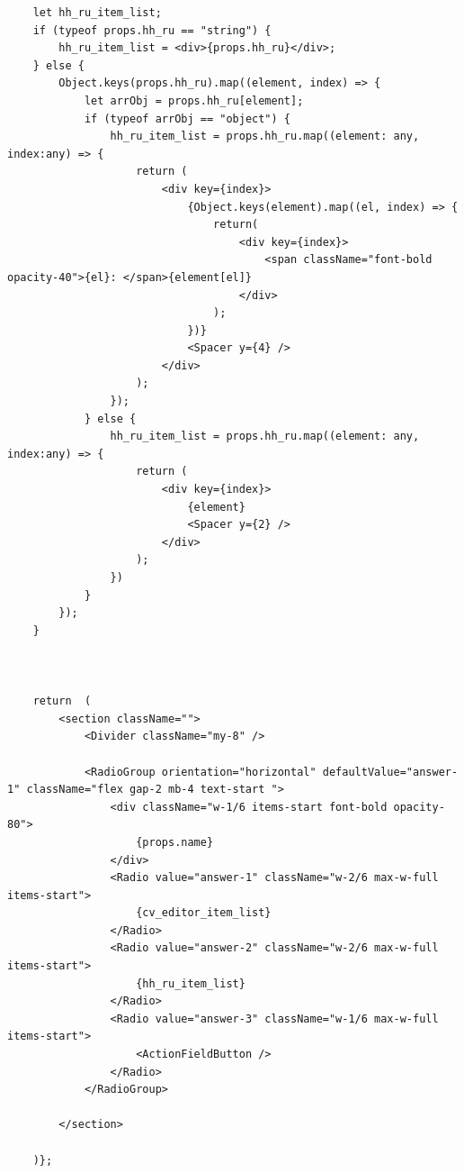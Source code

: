 \documentclass[master, och, pract]{SCWorks}
\begin{document}
\begin{verbatim}
    let hh_ru_item_list;
    if (typeof props.hh_ru == "string") {
        hh_ru_item_list = <div>{props.hh_ru}</div>;
    } else {
        Object.keys(props.hh_ru).map((element, index) => {
            let arrObj = props.hh_ru[element];
            if (typeof arrObj == "object") {
                hh_ru_item_list = props.hh_ru.map((element: any, index:any) => {
                    return (
                        <div key={index}>
                            {Object.keys(element).map((el, index) => {
                                return( 
                                    <div key={index}>
                                        <span className="font-bold opacity-40">{el}: </span>{element[el]}
                                    </div> 
                                );
                            })}
                            <Spacer y={4} />
                        </div>
                    );
                });  
            } else {
                hh_ru_item_list = props.hh_ru.map((element: any, index:any) => {
                    return (
                        <div key={index}>
                            {element}
                            <Spacer y={2} />
                        </div>
                    );
                })
            }
        });
    }



    return  (
        <section className="">        
            <Divider className="my-8" />

            <RadioGroup orientation="horizontal" defaultValue="answer-1" className="flex gap-2 mb-4 text-start ">     
                <div className="w-1/6 items-start font-bold opacity-80">
                    {props.name}
                </div>
                <Radio value="answer-1" className="w-2/6 max-w-full items-start">
                    {cv_editor_item_list}
                </Radio>
                <Radio value="answer-2" className="w-2/6 max-w-full items-start">
                    {hh_ru_item_list}
                </Radio>
                <Radio value="answer-3" className="w-1/6 max-w-full items-start">
                    <ActionFieldButton />
                </Radio>  
            </RadioGroup>
  
        </section>

    )};    
\end{verbatim}
\end{document}
